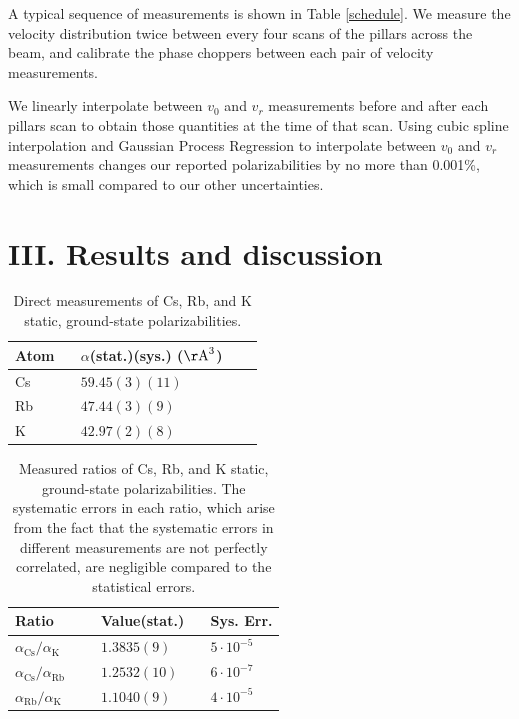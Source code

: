 \documentclass[twocolumn,prl,showpacs,superscriptaddress]{revtex4-1}   %
\newcommand{\sspace}{$\enspace$}
\newcommand{\ssspace}{$\quad$}
\newcommand{\ak}{\alpha_{\textrm{K}}}
\newcommand{\arb}{\alpha_{\textrm{Rb}}}
\newcommand{\acs}{\alpha_{\textrm{Cs}}}
\newcommand{\polK}{42.97(2)(8)}
\newcommand{\polRb}{47.44(3)(9)}
\newcommand{\polCs}{59.45(3)(11)}
\newcommand{\ratRbK}{1.1040(9)}
\newcommand{\ratCsK}{1.3835(9)}
\newcommand{\ratCsRb}{1.2532(10)}
\newcommand{\AAA}{\mathrm{\AA}}
\begin{document}
A typical sequence of measurements is shown in Table \ref{schedule}.
We measure the velocity distribution twice between every four scans of the pillars across the beam, and calibrate the phase choppers between each pair of velocity measurements.

We linearly interpolate between $v_0$ and $v_r$ measurements before and after each pillars scan to obtain those quantities at the time of that scan.
Using cubic spline interpolation and Gaussian Process Regression to interpolate between $v_0$ and $v_r$ measurements changes our reported polarizabilities by no more than 0.001\%, which is small compared to our other uncertainties.

\section{III. Results and discussion}

\begingroup
\begin{table}
\caption{\label{tableAbs}Direct measurements of Cs, Rb, and K static, ground-state polarizabilities.}
\begin{center}
\begin{tabular}{llll}
\hline\hline
Atom \sspace & $\alpha$(stat.)(sys.) ($\AAA^3$) \\
\hline
Cs & $\polCs$ \\
Rb & $\polRb$ \\
K  & $\polK$ \\
\hline\hline
\end{tabular}
\end{center}
\end{table}
\endgroup

\begingroup
\begin{table}
\caption{\label{tableRatio}Measured ratios of Cs, Rb, and K static, ground-state polarizabilities. The systematic errors in each ratio, which arise from the fact that the systematic errors in different measurements are not perfectly correlated, are negligible compared to the statistical errors.}
\begin{center}
\begin{tabular}{lll}
\hline\hline
Ratio \ssspace \ssspace & Value(stat.) \sspace & Sys. Err. \\
\hline
$\acs/\ak$  & $\ratCsK$ & $5\cdot 10^{-5}$  \\
$\acs/\arb$ & $\ratCsRb$ & $6\cdot 10^{-7}$ \\
$\arb/\ak$  & $\ratRbK$ & $4\cdot 10^{-5}$ \\
\hline\hline
\end{tabular}
\end{center}
\end{table}
\endgroup
\end{document}
